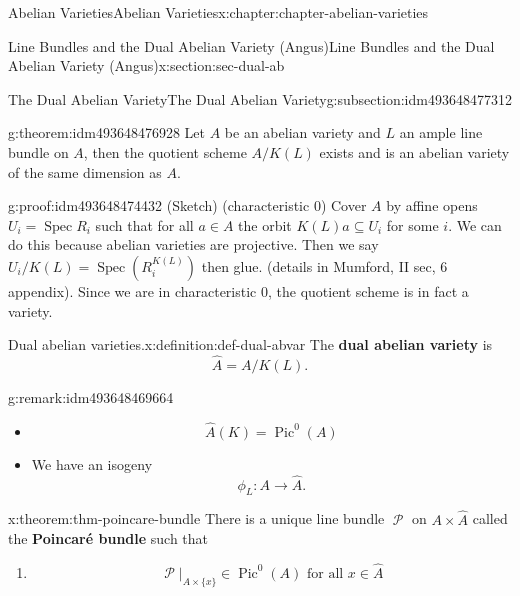 \documentclass[oneside,10pt,]{book}
\newcommand{\terminology}[1]{\textbf{#1}}
\numberwithin{equation}{section}
\newcommand{\sheaf}[1]{\operatorname{\mathcal{#1}}}
\DeclareMathOperator{\Pic}{Pic}
\DeclareMathOperator{\Spec}{Spec}
\begin{document}
\begin{chapterptx}{Abelian Varieties}{}{Abelian Varieties}{}{}{x:chapter:chapter-abelian-varieties}
\begin{sectionptx}{Line Bundles and the Dual Abelian Variety (Angus)}{}{Line Bundles and the Dual Abelian Variety (Angus)}{}{}{x:section:sec-dual-ab}
\typeout{************************************************}
%
\begin{subsectionptx}{The Dual Abelian Variety}{}{The Dual Abelian Variety}{}{}{g:subsection:idm493648477312}
\begin{theorem}{}{}{g:theorem:idm493648476928}%
Let \(A\) be an abelian variety and \(L\) an ample line bundle on \(A\), then the quotient scheme \(A/K(L)\) exists and is an abelian variety of the same dimension as \(A\).%
\end{theorem}
\begin{proofptx}{}{g:proof:idm493648474432}
(Sketch) (characteristic 0) Cover \(A\) by affine opens \(U_i = \Spec R_i\) such that for all \(a \in A\) the orbit \(K(L)a \subseteq U_i\) for some \(i\). We can do this because abelian varieties are projective. Then we say \(U_i / K(L) = \Spec(R^{K(L)}_i)\) then glue. (details in Mumford, II sec, 6  appendix). Since we are in characteristic 0, the quotient scheme is in fact a variety.%
\end{proofptx}
\begin{definition}{Dual abelian varieties.}{x:definition:def-dual-abvar}%
The \terminology{dual abelian variety} is%
\begin{equation*}
\hat A = A/K(L)\text{.}
\end{equation*}
%
\end{definition}
\begin{remark}{}{g:remark:idm493648469664}%
%
\begin{itemize}[label=\textbullet]
\item{}%
\begin{equation*}
\hat A(K) = \Pic^0(A)
\end{equation*}
%
\item{}We have an isogeny%
\begin{equation*}
\phi_L\colon A \to \hat A\text{.}
\end{equation*}
%
\end{itemize}
%
\end{remark}
\begin{theorem}{}{}{x:theorem:thm-poincare-bundle}%
There is a unique line bundle \(\sheaf P\) on \(A\times \hat A\) called the \terminology{Poincaré bundle} such that%
\begin{enumerate}
\item{}%
\begin{equation*}
\sheaf P|_{A\times \{x\}} \in \Pic^0(A) \text{ for all }x\in \hat A
\end{equation*}

\end{enumerate}
\end{theorem}
\end{subsectionptx}
\end{sectionptx}
\end{chapterptx}
\end{document}
